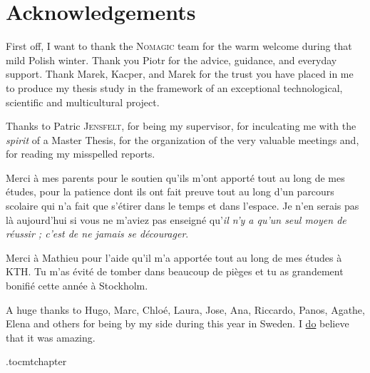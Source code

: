 \documentclass[/home/francois/latex/report/main.tex]{subfiles}
\begin{document}
%

\newpage
\thispagestyle{plain}
\chapter*{Acknowledgements}

First off, I want to thank the \textsc{Nomagic} team for the warm welcome during that mild Polish winter. Thank you Piotr for the advice, guidance, and everyday support. Thank Marek, Kacper, and Marek for the trust you have placed in me to produce my thesis study in the framework of an exceptional technological, scientific and multicultural project.

Thanks to Patric \textsc{Jensfelt}, for being my supervisor, for inculcating me with the \textit{spirit} of a Master Thesis, for the organization of the very valuable meetings and, for reading my misspelled reports.

Merci à mes parents pour le soutien qu'ils m'ont apporté tout au long de mes études, pour la patience dont ils ont fait preuve tout au long d'un parcours scolaire qui n'a fait que s'étirer dans le temps et dans l'espace. Je n'en serais pas là aujourd'hui si vous ne m'aviez pas enseigné qu'\textit{il n'y a qu'un seul moyen de réussir ; c'est de ne jamais se décourager}.

Merci à Mathieu pour l'aide qu'il m'a apportée tout au long de mes études à KTH. Tu m'as évité de tomber dans beaucoup de pièges et tu as grandement bonifié cette année à Stockholm.

A huge thanks to Hugo, Marc, Chloé, Laura, Jose, Ana, Riccardo, Panos, Agathe, Elena and others for being by my side during this year in Sweden. I \underline{do} believe that it was amazing.

\newpage



\newpage

\etocdepthtag.toc{mtchapter}
\thispagestyle{plain}
\tableofcontents

\newpage
\end{document}

